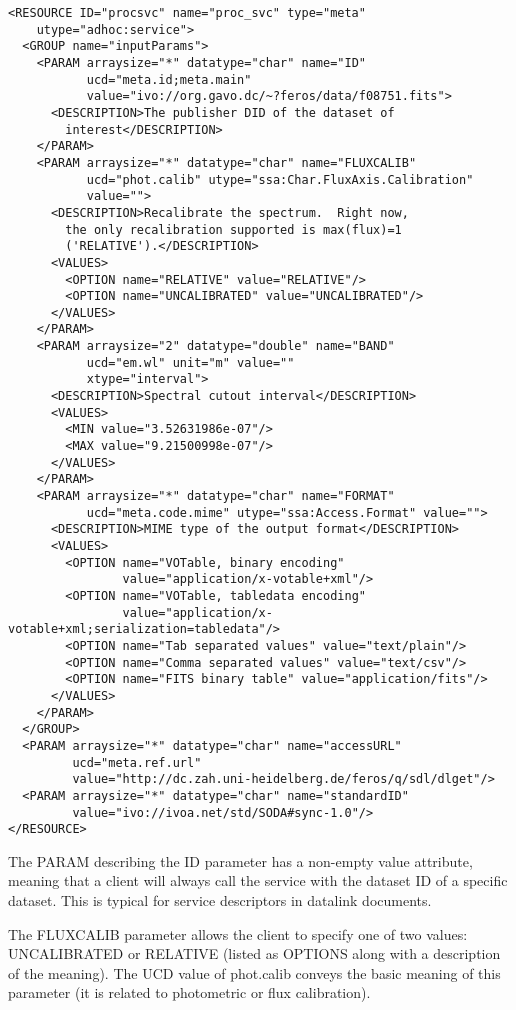 \documentclass[11pt,a4paper]{ivoa}
\begin{document}
{\small
\begin{verbatim}
<RESOURCE ID="procsvc" name="proc_svc" type="meta"
    utype="adhoc:service">
  <GROUP name="inputParams">
    <PARAM arraysize="*" datatype="char" name="ID"
           ucd="meta.id;meta.main"
           value="ivo://org.gavo.dc/~?feros/data/f08751.fits">
      <DESCRIPTION>The publisher DID of the dataset of
        interest</DESCRIPTION>
    </PARAM>
    <PARAM arraysize="*" datatype="char" name="FLUXCALIB"
           ucd="phot.calib" utype="ssa:Char.FluxAxis.Calibration"
           value="">
      <DESCRIPTION>Recalibrate the spectrum.  Right now,
        the only recalibration supported is max(flux)=1
        ('RELATIVE').</DESCRIPTION>
      <VALUES>
        <OPTION name="RELATIVE" value="RELATIVE"/>
        <OPTION name="UNCALIBRATED" value="UNCALIBRATED"/>
      </VALUES>
    </PARAM>
    <PARAM arraysize="2" datatype="double" name="BAND"
           ucd="em.wl" unit="m" value=""
           xtype="interval">
      <DESCRIPTION>Spectral cutout interval</DESCRIPTION>
      <VALUES>
        <MIN value="3.52631986e-07"/>
        <MAX value="9.21500998e-07"/>
      </VALUES>
    </PARAM>
    <PARAM arraysize="*" datatype="char" name="FORMAT"
           ucd="meta.code.mime" utype="ssa:Access.Format" value="">
      <DESCRIPTION>MIME type of the output format</DESCRIPTION>
      <VALUES>
        <OPTION name="VOTable, binary encoding"
                value="application/x-votable+xml"/>
        <OPTION name="VOTable, tabledata encoding"
                value="application/x-votable+xml;serialization=tabledata"/>
        <OPTION name="Tab separated values" value="text/plain"/>
        <OPTION name="Comma separated values" value="text/csv"/>
        <OPTION name="FITS binary table" value="application/fits"/>
      </VALUES>
    </PARAM>
  </GROUP>
  <PARAM arraysize="*" datatype="char" name="accessURL"
         ucd="meta.ref.url"
         value="http://dc.zah.uni-heidelberg.de/feros/q/sdl/dlget"/>
  <PARAM arraysize="*" datatype="char" name="standardID"
         value="ivo://ivoa.net/std/SODA#sync-1.0"/>
</RESOURCE>
\end{verbatim}
}

The PARAM describing the ID parameter has a non-empty value attribute,
meaning that a client will always call the service with the dataset ID
of a specific dataset.  This is typical for service descriptors in
datalink documents.

The FLUXCALIB parameter allows the client to specify one of two values:
UNCALIBRATED or RELATIVE (listed as OPTIONS along with a description of
the meaning). The UCD \citep{2005ivoa.spec.0819D} value
of phot.calib conveys the basic meaning
of this parameter (it is related to photometric or flux calibration).
\end{document}
